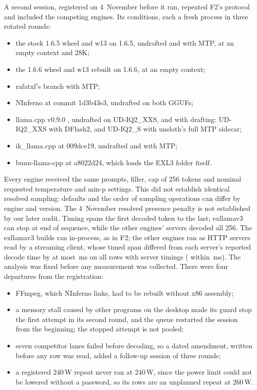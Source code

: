 \documentclass[11pt,letterpaper]{article}
\begin{document}
A second session, registered on 4~November before it ran, repeated F2's
protocol and included the competing engines. Its conditions, each a fresh process in
three rotated rounds:
\begin{itemize}\setlength{\itemsep}{1pt}
\item the stock 1.6.5 wheel and w13 on 1.6.5, undrafted and with MTP, at an
empty context and 28K;
\item the 1.6.6 wheel and w13 rebuilt on 1.6.6, at an empty context;
\item rafatxf's branch with MTP;
\item NInferno \citep{brontir2026ninferno} at commit 1d3b43e3, undrafted on
both GGUFs;
\item llama.cpp v0.9.0 \citep{ggml2026llamacpp090}, undrafted on UD-IQ2\_XXS,
and with drafting: UD-IQ2\_XXS with DFlash2, and UD-IQ2\_S with unsloth's
full MTP sidecar;
\item ik\_llama.cpp \citep{ikawrakow2025ikllama} at 009dce19, undrafted and
with MTP;
\item buun-llama-cpp \citep{spiritbuun2026buun} at a8022d24, which loads the
EXL3 folder itself.
\end{itemize}
Every engine received the same prompts, filler, cap of 256 tokens and
nominal requested temperature and min-p settings. This did not establish
identical resolved sampling: defaults and the order of sampling operations
can differ by engine and version. The 4~November resolved presence penalty
is not established by our later audit. Timing spans the first decoded token
to the last; exllamav3 can stop at end of sequence, while the other engines'
servers decoded all 256. The exllamav3 builds ran in-process,
as in F2; the other engines ran as HTTP servers read by a streaming client,
whose timed span differed from each server's reported decode time by at most
\PeCfTimingMaxMs\,ms on all \PeCfTimingN{} rows with server timings
(\PeCfTimingCloseN{} within \PeCfTimingCloseMs\,ms). The analysis was fixed before any measurement was collected. There were four departures from the registration:
\begin{itemize}\setlength{\itemsep}{1pt}
\item FFmpeg, which NInferno links, had to be rebuilt without x86 assembly;
\item a memory stall caused by other programs on the desktop made its guard
stop the first attempt in its second round, and the queue restarted the
session from the beginning; the stopped attempt is not pooled;
\item seven competitor lanes failed before decoding, so a dated amendment,
written before any row was read, added a follow-up session of three rounds;
\item a registered 240\,W repeat never ran at 240\,W, since the power limit
could not be lowered without a password, so its rows are an unplanned repeat
at 260\,W.
\end{itemize}
\end{document}
